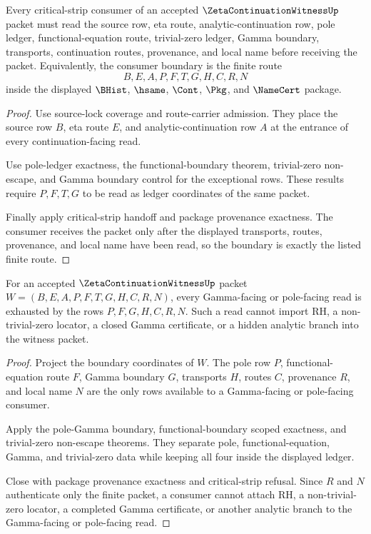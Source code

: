 \begin{theorem}
\label{thm:zeta-continuation-witness-critical-strip-source-boundary}
Every critical-strip consumer of an accepted $\ZetaContinuationWitnessUp$ packet must read the source row, eta route, analytic-continuation row, pole ledger, functional-equation route, trivial-zero ledger, Gamma boundary, transports, continuation routes, provenance, and local name before receiving the packet. Equivalently, the consumer boundary is the finite route
$$
B,E,A,P,F,T,G,H,C,R,N
$$
inside the displayed $\BHist$, $\hsame$, $\Cont$, $\Pkg$, and $\NameCert$ package.
\end{theorem}
\begin{proof}
Use source-lock coverage and route-carrier admission. They place the source row $B$, eta route $E$, and analytic-continuation row $A$ at the entrance of every continuation-facing read.

Use pole-ledger exactness, the functional-boundary theorem, trivial-zero non-escape, and Gamma boundary control for the exceptional rows. These results require $P,F,T,G$ to be read as ledger coordinates of the same packet.

Finally apply critical-strip handoff and package provenance exactness. The consumer receives the packet only after the displayed transports, routes, provenance, and local name have been read, so the boundary is exactly the listed finite route.
\end{proof}

\begin{theorem}
\label{thm:zeta-continuation-witness-gamma-ledger-exhaustion}
For an accepted $\ZetaContinuationWitnessUp$ packet $W=(B,E,A,P,F,T,G,H,C,R,N)$, every Gamma-facing or pole-facing read is exhausted by the rows $P,F,G,H,C,R,N$. Such a read cannot import RH, a non-trivial-zero locator, a closed Gamma certificate, or a hidden analytic branch into the witness packet.
\end{theorem}
\begin{proof}
Project the boundary coordinates of $W$. The pole row $P$, functional-equation route $F$, Gamma boundary $G$, transports $H$, routes $C$, provenance $R$, and local name $N$ are the only rows available to a Gamma-facing or pole-facing consumer.

Apply the pole-Gamma boundary, functional-boundary scoped exactness, and trivial-zero non-escape theorems. They separate pole, functional-equation, Gamma, and trivial-zero data while keeping all four inside the displayed ledger.

Close with package provenance exactness and critical-strip refusal. Since $R$ and $N$ authenticate only the finite packet, a consumer cannot attach RH, a non-trivial-zero locator, a completed Gamma certificate, or another analytic branch to the Gamma-facing or pole-facing read.
\end{proof}

